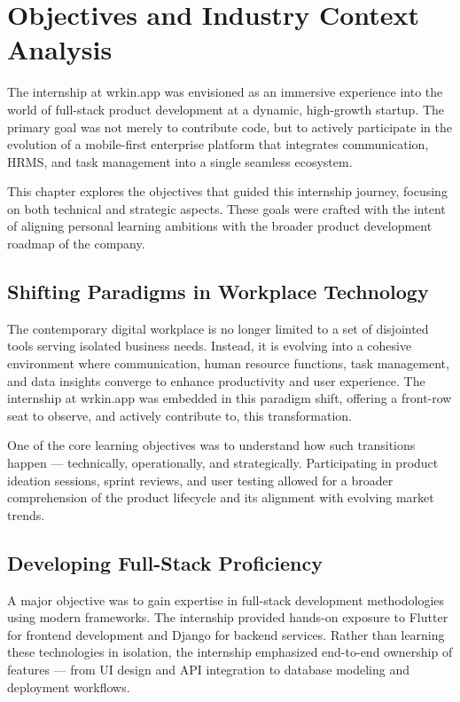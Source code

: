 \chapter{Objectives and Industry Context Analysis}

The internship at wrkin.app was envisioned as an immersive experience into the world of full-stack product development at a dynamic, high-growth startup. The primary goal was not merely to contribute code, but to actively participate in the evolution of a mobile-first enterprise platform that integrates communication, HRMS, and task management into a single seamless ecosystem.

This chapter explores the objectives that guided this internship journey, focusing on both technical and strategic aspects. These goals were crafted with the intent of aligning personal learning ambitions with the broader product development roadmap of the company.

\section{Shifting Paradigms in Workplace Technology}

The contemporary digital workplace is no longer limited to a set of disjointed tools serving isolated business needs. Instead, it is evolving into a cohesive environment where communication, human resource functions, task management, and data insights converge to enhance productivity and user experience. The internship at wrkin.app was embedded in this paradigm shift, offering a front-row seat to observe, and actively contribute to, this transformation.

One of the core learning objectives was to understand how such transitions happen — technically, operationally, and strategically. Participating in product ideation sessions, sprint reviews, and user testing allowed for a broader comprehension of the product lifecycle and its alignment with evolving market trends.

\section{Developing Full-Stack Proficiency}

A major objective was to gain expertise in full-stack development methodologies using modern frameworks. The internship provided hands-on exposure to Flutter for frontend development and Django for backend services. Rather than learning these technologies in isolation, the internship emphasized end-to-end ownership of features — from UI design and API integration to database modeling and deployment workflows.


